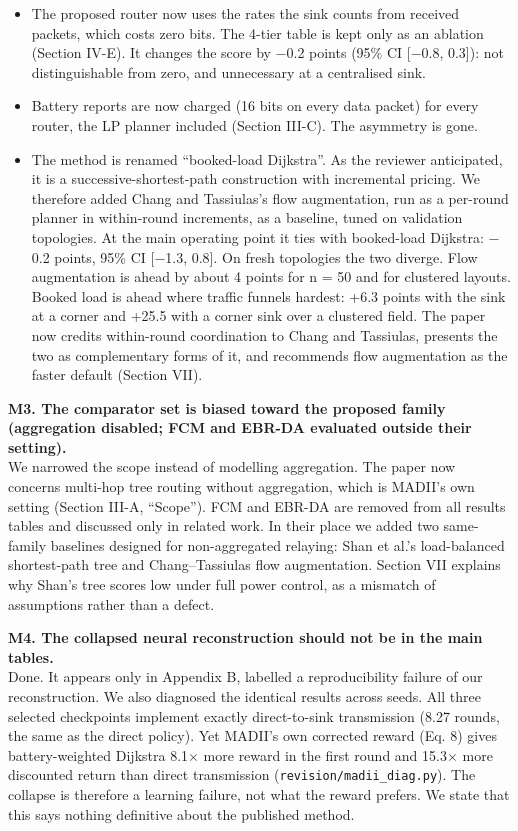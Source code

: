 \documentclass[11pt]{article}
\begin{document}
\begin{itemize}[leftmargin=*,itemsep=2pt]
\item The proposed router now uses the rates the sink counts from received packets, which costs zero bits. The 4-tier table is kept only as an ablation (Section IV-E). It changes the score by $-$0.2 points (95\% CI [$-$0.8, 0.3]): not distinguishable from zero, and unnecessary at a centralised sink.
\item Battery reports are now charged (16 bits on every data packet) for every router, the LP planner included (Section III-C). The asymmetry is gone.
\item The method is renamed ``booked-load Dijkstra''. As the reviewer anticipated, it is a successive-shortest-path construction with incremental pricing. We therefore added Chang and Tassiulas's flow augmentation, run as a per-round planner in within-round increments, as a baseline, tuned on validation topologies. At the main operating point it ties with booked-load Dijkstra: $-$0.2 points, 95\% CI [$-$1.3, 0.8]. On fresh topologies the two diverge. Flow augmentation is ahead by about 4 points for n = 50 and for clustered layouts. Booked load is ahead where traffic funnels hardest: +6.3 points with the sink at a corner and +25.5 with a corner sink over a clustered field. The paper now credits within-round coordination to Chang and Tassiulas, presents the two as complementary forms of it, and recommends flow augmentation as the faster default (Section VII).
\end{itemize}

\medskip\noindent \textbf{M3. The comparator set is biased toward the proposed family (aggregation disabled; FCM and EBR-DA evaluated outside their setting).}\\
We narrowed the scope instead of modelling aggregation. The paper now concerns multi-hop tree routing without aggregation, which is MADII's own setting (Section III-A, ``Scope''). FCM and EBR-DA are removed from all results tables and discussed only in related work. In their place we added two same-family baselines designed for non-aggregated relaying: Shan et al.'s load-balanced shortest-path tree and Chang--Tassiulas flow augmentation. Section VII explains why Shan's tree scores low under full power control, as a mismatch of assumptions rather than a defect.

\medskip\noindent \textbf{M4. The collapsed neural reconstruction should not be in the main tables.}\\
Done. It appears only in Appendix B, labelled a reproducibility failure of our reconstruction. We also diagnosed the identical results across seeds. All three selected checkpoints implement exactly direct-to-sink transmission (8.27 rounds, the same as the direct policy). Yet MADII's own corrected reward (Eq. 8) gives battery-weighted Dijkstra 8.1$\times$ more reward in the first round and 15.3$\times$ more discounted return than direct transmission (\texttt{revision/madii\_diag.py}). The collapse is therefore a learning failure, not what the reward prefers. We state that this says nothing definitive about the published method.
\end{document}
